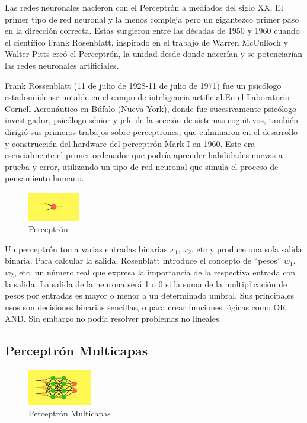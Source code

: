 \documentclass[a4paper]{article}
\begin{document}
Las redes neuronales nacieron con el Perceptrón a mediados del 
siglo XX. El primer tipo de red neuronal y la menos compleja pero 
un gigantezco primer paso en la dirección correcta. Estas surgieron
entre las décadas de 1950 y 1960 cuando el científico Frank Rosenblatt, 
inspirado en el trabajo de Warren McCulloch y Walter Pitts creó el 
Perceptrón, la unidad desde donde nacerían y se potenciarían las 
redes neuronales artificiales.

Frank Rossenblatt (11 de julio de 1928-11 de julio de 1971) fue un
psicólogo estadounidense notable en el campo de inteligencia
artificial.En el Laboratorio Cornell Aeronáutico en Búfalo (Nueva
York), donde fue sucesivamente psicólogo investigador, psicólogo
sénior y jefe de la sección de sistemas cognitivos,
también dirigió sus primeros trabajos 
sobre perceptrones, que culminaron en el desarrollo
y construcción del hardware del 
perceptrón Mark I en 1960.
Este era esencialmente el primer ordenador que podría aprender 
habilidades nuevas a prueba y error, utilizando un tipo de red 
neuronal que simula el proceso de pensamiento humano. 

\begin{figure} %
    \centering
    \includegraphics[width=0.2\textwidth]{./images/net_perceptron.png}
    \caption{Perceptrón}
\end{figure}

Un perceptrón toma varias entradas binarias $x_1$, $x_2$, etc y produce 
una sola salida binaria. Para calcular la salida, Rosenblatt 
introduce el concepto de ``pesos'' $w_1$, $w_2$, etc, un número real que 
expresa la importancia de la respectiva entrada con la salida. La 
salida de la neurona será 1 o 0 si la suma de la multiplicación de 
pesos por entradas es mayor o menor a un determinado umbral.
Sus principales usos son decisiones binarias sencillas, o para 
crear funciones lógicas como OR, AND. Sin embargo no podía 
resolver problemas no lineales.

\qquad

\subsection{Perceptrón Multicapas}
\begin{figure} %
    \centering
    \includegraphics[width=0.25\textwidth]{./images/net_multilayer.png}
    \caption{Perceptrón Multicapas}
\end{figure}
\end{document}
